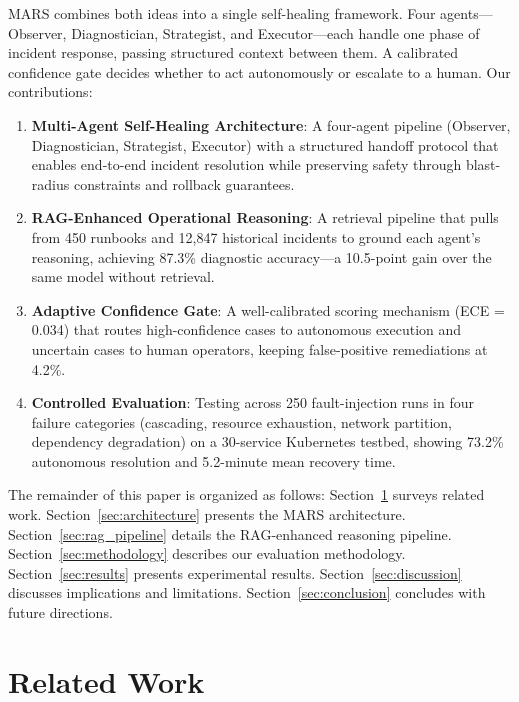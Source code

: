 \documentclass[journal]{IEEEtran}
\begin{document}
MARS combines both ideas into a single self-healing framework. Four agents---Observer, Diagnostician, Strategist, and Executor---each handle one phase of incident response, passing structured context between them. A calibrated confidence gate decides whether to act autonomously or escalate to a human. Our contributions:

\begin{enumerate}
    \item \textbf{Multi-Agent Self-Healing Architecture}: A four-agent pipeline (Observer, Diagnostician, Strategist, Executor) with a structured handoff protocol that enables end-to-end incident resolution while preserving safety through blast-radius constraints and rollback guarantees.
    
    \item \textbf{RAG-Enhanced Operational Reasoning}: A retrieval pipeline that pulls from 450 runbooks and 12,847 historical incidents to ground each agent's reasoning, achieving 87.3\% diagnostic accuracy---a 10.5-point gain over the same model without retrieval.
    
    \item \textbf{Adaptive Confidence Gate}: A well-calibrated scoring mechanism (ECE = 0.034) that routes high-confidence cases to autonomous execution and uncertain cases to human operators, keeping false-positive remediations at 4.2\%.
    
    \item \textbf{Controlled Evaluation}: Testing across 250 fault-injection runs in four failure categories (cascading, resource exhaustion, network partition, dependency degradation) on a 30-service Kubernetes testbed, showing 73.2\% autonomous resolution and 5.2-minute mean recovery time.
\end{enumerate}

The remainder of this paper is organized as follows: Section~\ref{sec:related_work} surveys related work. Section~\ref{sec:architecture} presents the MARS architecture. Section~\ref{sec:rag_pipeline} details the RAG-enhanced reasoning pipeline. Section~\ref{sec:methodology} describes our evaluation methodology. Section~\ref{sec:results} presents experimental results. Section~\ref{sec:discussion} discusses implications and limitations. Section~\ref{sec:conclusion} concludes with future directions.

\section{Related Work}
\label{sec:related_work}
\end{document}
